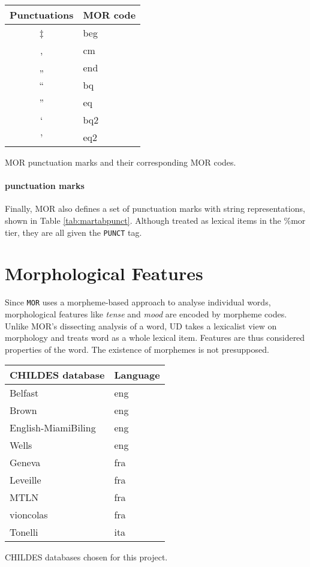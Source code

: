 \begin{margintable}[1\baselineskip] %
\begin{tabularx}{\textwidth}{@{}cl@{}}
\toprule
\textbf{Punctuations} & \textbf{MOR code}\\\midrule
‡ & beg\\
, & cm\\
„ & end\\
“ & bq\\
” & eq\\
‘ & bq2\\
’ & eq2\\\bottomrule
\end{tabularx}
\caption{\label{tab:martabpunct}MOR punctuation marks and their corresponding MOR codes.}
\footnotesize
\end{margintable}

\paragraph{punctuation marks}
Finally, MOR also defines a set of punctuation marks with string representations, shown in Table \ref{tab:martabpunct}. Although treated as lexical items in the \%mor tier, they are all given the \texttt{PUNCT} tag.

\section{Morphological Features}
\label{sec:feats}

Since \texttt{MOR} uses a morpheme-based approach to analyse individual words, morphological features like \emph{tense} and \emph{mood} are encoded by morpheme codes. Unlike MOR's dissecting analysis of a word, UD takes a lexicalist view on morphology and treats word as a whole lexical item. Features are thus considered properties of the word. The existence of morphemes is not presupposed.

\begin{margintable}[1\baselineskip]
\begin{tabularx}{1\textwidth}{@{}ll@{}}
\toprule
\textbf{CHILDES database} & \textbf{Language}\\ \midrule
    Belfast & eng\\
    Brown & eng\\
    English-MiamiBiling & eng\\
    Wells & eng\\
    Geneva & fra\\
    Leveille & fra\\
    MTLN & fra\\
    vioncolas & fra\\
    Tonelli & ita\\\bottomrule
\end{tabularx}
\caption{\label{tab:martabdb}CHILDES databases chosen for this project.}
\footnotesize
\end{margintable}

